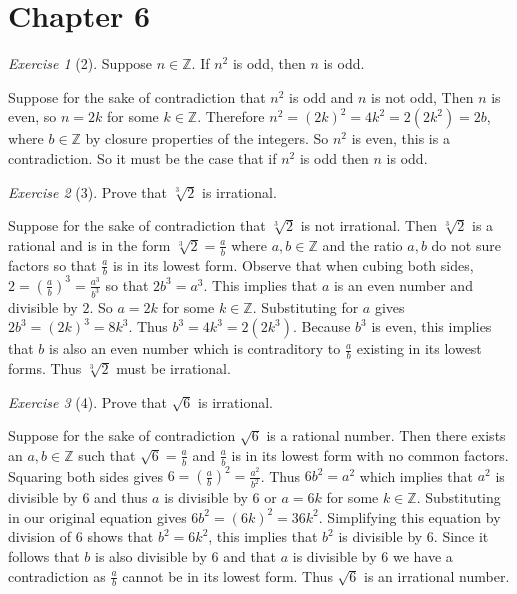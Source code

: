 \documentclass[12pt]{amsart}
\makeatletter
\theoremstyle{remark}
\newtheorem*{exercise}{Exercise}%
\def\ZZ{\ensuremath{\mathbb Z}}
\renewenvironment{proof}[1][\proofname]{\par\doublespacing
  \pushQED{\qed}%
  \normalfont \topsep6\p@\@plus6\p@\relax
  \list{}{%
    \settowidth{\leftmargin}{\itshape\proofname:\hskip\labelsep}%
    \setlength{\labelwidth}{0pt}%
    \setlength{\itemindent}{-\leftmargin}%
  }%
  \item[\hskip\labelsep\itshape#1\@addpunct{:}]\ignorespaces
}{%
  \popQED\endlist\@endpefalse
  \singlespacing
}
\theoremstyle{mycomment}
\makeatother
\begin{document}
\thispagestyle{fancy}

\section*{Chapter 6}
\begin{exercise}[2] Suppose $n\in\ZZ$. If $n^{2}$ is odd, then $n$ is odd.
\begin{proof}
  Suppose for the sake of contradiction that $n^2$ is odd and $n$ is not odd, Then $n$ is even, so $n = 2k$ for some $k\in\ZZ$. Therefore $n^2 = (2k)^2 = 4k^2 = 2(2k^2) = 2b$, where $b\in\ZZ$ by closure properties of the integers. So $n^2$ is even, this is a contradiction. So it must be the case that if $n^2$ is odd then $n$ is odd. 
\end{proof}
\end{exercise}

\begin{exercise}[3] Prove that $\sqrt[3]{2}$ is irrational.
\begin{proof}
  Suppose for the sake of contradiction that $\sqrt[3]{2}$ is not irrational. Then $\sqrt[3]{2}$ is a rational and is in the form $\sqrt[3]{2} = \frac{a}{b}$ where $a,b\in\ZZ$ and the ratio $a,b$ do not sure factors so that $\frac{a}{b}$ is in its lowest form. Observe that when cubing both sides, $2 = (\frac{a}{b})^3 = \frac{a^3}{b^3}$ so that $2b^3 = a^3$. This implies that $a$ is an even number and divisible by $2$. So $a = 2k$ for some $k\in\ZZ$. Substituting for $a$ gives $2b^3 = (2k)^3 = 8k^3$. Thus $b^3 = 4k^3 = 2(2k^3)$.  Because $b^3$ is even, this implies that $b$ is also an even number which is contraditory to $\frac{a}{b}$ existing in its lowest forms. Thus $\sqrt[3]{2}$ must be irrational.
\end{proof}
\end{exercise}

\begin{exercise}[4] Prove that $\sqrt{6}$ is irrational.
\begin{proof}
  Suppose for the sake of contradiction $\sqrt{6}$ is a rational number. Then there exists an $a,b\in\ZZ$ such that $\sqrt{6} = \frac{a}{b}$ and $\frac{a}{b}$ is in its lowest form with no common factors. Squaring both sides gives $6 = (\frac{a}{b})^2 = \frac{a^2}{b^2}$. Thus $6b^2 = a^2$ which implies that $a^2$ is divisible by $6$ and thus $a$ is divisible by $6$ or $a = 6k$ for some $k\in\ZZ$. Substituting in our original equation gives $6b^2 = (6k)^2 = 36k^2$. Simplifying this equation by division of $6$ shows that $b^2 = 6k^2$, this implies that $b^2$ is divisible by $6$. Since it follows that $b$ is also divisible by $6$ and that $a$ is divisible by $6$ we have a contradiction as $\frac{a}{b}$ cannot be in its lowest form. Thus $\sqrt{6}$ is an irrational number. 
\end{proof}
\end{exercise}
\end{document}
